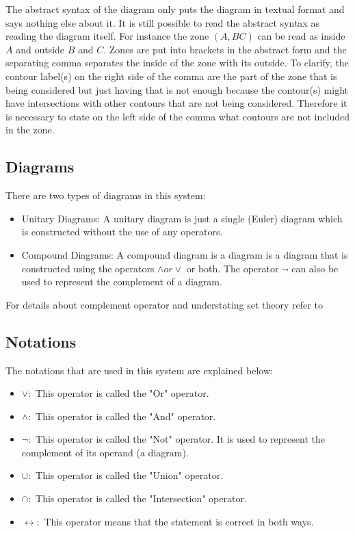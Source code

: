 \documentclass[a4paper]{article}
\begin{document}
The abstract syntax of the diagram only puts the diagram in textual format and says nothing else about it. It is still possible to read the abstract syntax as reading the diagram itself. For instance the zone $(A, BC)$ can be read as inside $A$ and outside $B$ and $C$. Zones are put into brackets in the abstract form and the separating comma separates the inside of the zone with its outside. To clarify, the contour label(s) on the right side of the comma are the part of the zone that is being considered but just having that is not enough because the contour(s) might have intersections with other contours that are not being considered. Therefore it is necessary to state on the left side of the comma what contours are not included in the zone.

\subsection{Diagrams}
There are two types of diagrams in this system:
\begin{itemize}
\item Unitary Diagrams: A unitary diagram is just a single (Euler) diagram which is constructed without the use of any operators.
\item Compound Diagrams: A compound diagram is a diagram is a diagram that is constructed using the operators $\wedge or \vee$ or both. The operator $\neg$ can also be used to represent the complement of a diagram.
\end{itemize}

For details about complement operator and understating set theory refer to \cite{Taylor_book}

\subsection{Notations}
The notations that are used in this system are explained below:

\begin{itemize}
\item $ \vee : $ This operator is called the "Or" operator.   \\
\item $ \wedge : $ This operator is called the "And" operator.  \\
\item $ \neg : $ This operator is called the "Not" operator. It is used to represent the complement of its operand (a diagram). \\
\item $ \cup : $ This operator is called the "Union" operator.  \\
\item $ \cap : $ This operator is called the "Intersection" operator. \\
\item $ \leftrightarrow : $ This operator means that the statement is correct in both ways. \\
\end{itemize}
\end{document}
